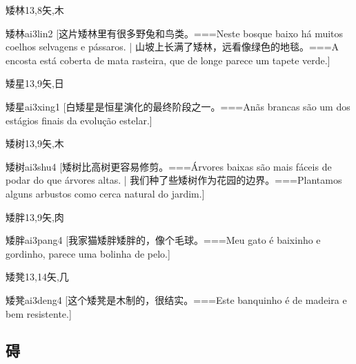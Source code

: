 \begin{Entry}{矮林}{13,8}{⽮,⽊}
  \begin{Phonetics}{矮林}{ai3lin2}
    [这片矮林里有很多野兔和鸟类。===Neste bosque baixo há muitos coelhos selvagens e pássaros. | 山坡上长满了矮林，远看像绿色的地毯。===A encosta está coberta de mata rasteira, que de longe parece um tapete verde.]
  \end{Phonetics}
\end{Entry}

\begin{Entry}{矮星}{13,9}{⽮,⽇}
  \begin{Phonetics}{矮星}{ai3xing1}
    [白矮星是恒星演化的最终阶段之一。===Anãs brancas são um dos estágios finais da evolução estelar.]
  \end{Phonetics}
\end{Entry}

\begin{Entry}{矮树}{13,9}{⽮,⽊}
  \begin{Phonetics}{矮树}{ai3shu4}
    [矮树比高树更容易修剪。===Árvores baixas são mais fáceis de podar do que árvores altas. | 我们种了些矮树作为花园的边界。===Plantamos alguns arbustos como cerca natural do jardim.]
  \end{Phonetics}
\end{Entry}

\begin{Entry}{矮胖}{13,9}{⽮,⾁}
  \begin{Phonetics}{矮胖}{ai3pang4}
    [我家猫矮胖矮胖的，像个毛球。===Meu gato é baixinho e gordinho, parece uma bolinha de pelo.]
  \end{Phonetics}
\end{Entry}

\begin{Entry}{矮凳}{13,14}{⽮,⼏}
  \begin{Phonetics}{矮凳}{ai3deng4}
    [这个矮凳是木制的，很结实。===Este banquinho é de madeira e bem resistente.]
  \end{Phonetics}
\end{Entry}

\subsection*{碍}

